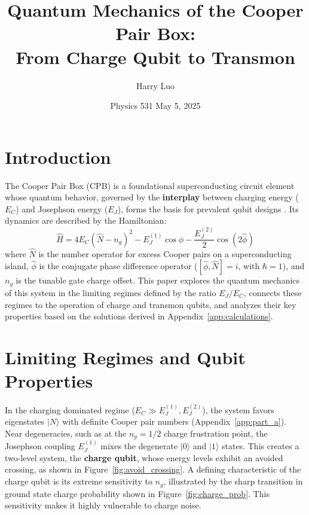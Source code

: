 \documentclass[12pt]{article}
\title{\textbf{Quantum Mechanics of the Cooper Pair Box:\\From Charge Qubit to Transmon}}
\author{Harry Luo}
\date{\small Physics 531 \hspace{2em} May 5, 2025} %
\begin{document}
\maketitle

\section*{Introduction}

The Cooper Pair Box (CPB) is a foundational superconducting circuit element whose quantum behavior, governed by the \textbf{interplay} between charging energy ($E_C$) and Josephson energy ($E_J$), forms the basis for prevalent qubit designs \cite{Kjaergaard2020}. Its dynamics are described by the Hamiltonian:
\begin{equation}
\hat{H} = 4 E_C (\hat{N} - n_g)^2 - E_J^{(1)} \cos \hat{\phi} - \frac{E_J^{(2)}}{2} \cos (2 \hat{\phi})
\label{eq:main_hamiltonian_final}
\end{equation}
where $\hat{N}$ is the number operator for excess Cooper pairs on a superconducting island, $\hat{\phi}$ is the conjugate phase difference operator ($[\hat{\phi}, \hat{N}] = i$, with $\hbar=1$), and $n_g$ is the tunable gate charge offset. This paper explores the quantum mechanics of this system in the limiting regimes defined by the ratio $E_J/E_C$, connects these regimes to the operation of charge and transmon qubits, and analyzes their key properties based on the solutions derived in Appendix~\ref{app:calculations}.

\section*{Limiting Regimes and Qubit Properties}

In the charging dominated regime ($E_C \gg E_J^{(1)}, E_J^{(2)}$), the system favors eigenstates $|N\rangle$ with definite Cooper pair numbers (Appendix~\ref{app:part_a}). Near degeneracies, such as at the $n_g=1/2$ charge frustration point, the Josephson coupling $E_J^{(1)}$ mixes the degenerate $|0\rangle$ and $|1\rangle$ states. This creates a two-level system, the \textbf{charge qubit}, whose energy levels exhibit an avoided crossing, as shown in Figure~\ref{fig:avoid_crossing}. A defining characteristic of the charge qubit is its extreme sensitivity to $n_g$, illustrated by the sharp transition in ground state charge probability shown in Figure~\ref{fig:charge_prob}. This sensitivity makes it highly vulnerable to charge noise.
\end{document}
